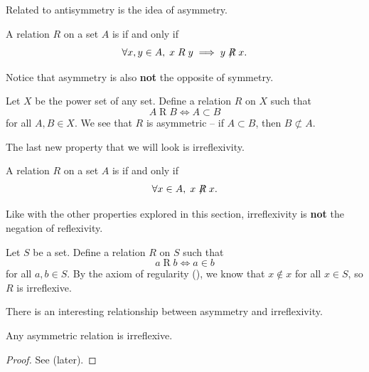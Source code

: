 Related to antisymmetry is the idea of asymmetry.

\begin{definition}[Asymmetry]
    A relation $R$ on a set $A$ is  if and only if
    \[
        \forall x,y \in A,\; x \mathrel{R} y \implies y \not\mathrel{R} x.
    \]
\end{definition}
\begin{remark}
    Notice that asymmetry is also \textbf{not} the opposite of symmetry.
\end{remark}

\begin{example}
    Let $X$ be the power set of any set. Define a relation $R$ on $X$ such that
    \[
        A \mathrel{R} B \iff A \subset B
    \]
    for all $A, B \in X$. We see that $R$ is asymmetric -- if $A \subset B$, then $B \not\subset A$.
\end{example}

The last new property that we will look is irreflexivity.

\begin{definition}[Irreflexive]
    A relation $R$ on a set $A$ is  if and only if
    \[
        \forall x \in A,\; x\not\mathrel{R}x.
    \]
\end{definition}
\begin{remark}
    Like with the other properties explored in this section, irreflexivity is \textbf{not} the negation of reflexivity.
\end{remark}

\begin{example}
    Let $S$ be a set. Define a relation $R$ on $S$ such that
    \[
        a \mathrel{R} b \iff a \in b
    \]
    for all $a, b \in S$. By the axiom of regularity (), we know that $x \notin x$ for all $x \in S$, so $R$ is irreflexive.
\end{example}

There is an interesting relationship between asymmetry and irreflexivity.

\begin{proposition}
    Any asymmetric relation is irreflexive.
\end{proposition}
\begin{proof}
    See  (later).
\end{proof}


